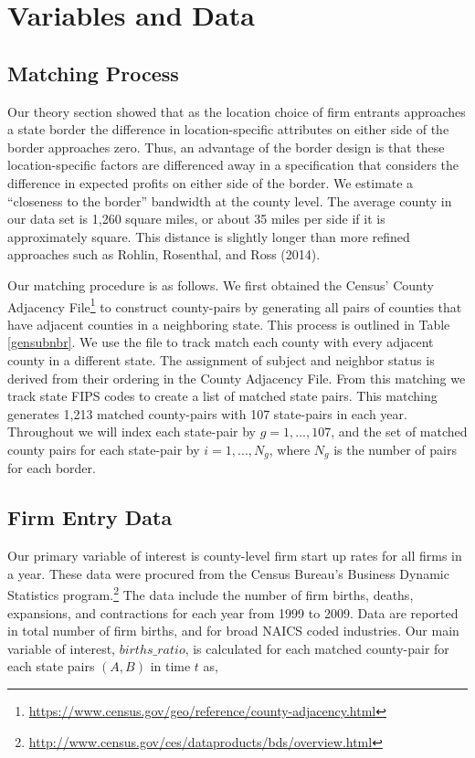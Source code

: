 \section{Variables and Data}

\subsection{Matching Process}

Our theory section showed that as the location choice of firm entrants approaches a state border the  difference in location-specific attributes on either side of the border approaches zero.  Thus, an advantage of the border design is that these location-specific factors are differenced away in a specification that considers the difference in expected profits on either side of the border.  We estimate a “closeness to the border” bandwidth at the county level. The average county in our data set is 1,260 square miles, or about 35 miles per side if it is approximately square. This distance is slightly longer than more refined approaches such as Rohlin, Rosenthal, and Ross (2014). 

Our matching procedure is as follows. We first obtained the Census' County Adjacency File\footnote{\url{https://www.census.gov/geo/reference/county-adjacency.html}} to construct county-pairs by generating all pairs of counties that have adjacent counties in a neighboring state. This process is outlined in Table \ref{gensubnbr}. We use the file to track match each county with every adjacent county in a different state. The assignment of subject and neighbor status is derived from their ordering in the County Adjacency File. From this matching we track state FIPS codes to create a list of matched state pairs. This matching generates 1,213 matched county-pairs with 107 state-pairs in each year. Throughout we will index each state-pair by $g = 1,...,107$, and the set of matched county pairs for each state-pair by $i = 1,...,N_{g}$, where $N_g$ is the number of pairs for each border.


\subsection{Firm Entry Data}

Our primary variable of interest is county-level firm start up rates for all firms in a year. These data were procured from the Census Bureau’s Business Dynamic Statistics program.\footnote{\url{http://www.census.gov/ces/dataproducts/bds/overview.html}} The data include the number of firm births, deaths, expansions, and contractions for each year from 1999 to 2009. Data are reported in total number of firm births, and for broad NAICS coded industries. Our main variable of interest, $births\_ratio$, is calculated for each matched county-pair for each state pairs $(A, B)$ in time $t$ as, 

